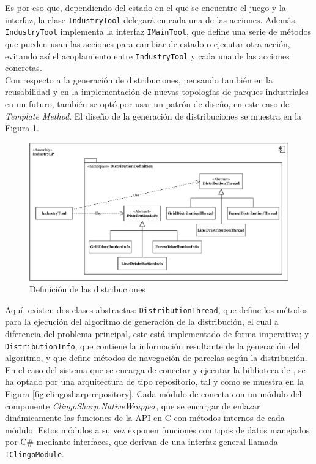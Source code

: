 Es por eso que, dependiendo del estado en el que se encuentre el juego y la interfaz, la clase \texttt{IndustryTool} delegará en cada una de las acciones. Además, \texttt{IndustryTool} implementa la interfaz \texttt{IMainTool}, que define una serie de métodos que pueden usan las acciones para cambiar de estado o ejecutar otra acción, evitando así el acoplamiento entre \texttt{IndustryTool} y cada una de las acciones concretas. \\

Con respecto a la generación de distribuciones, pensando también en la reusabilidad y en la implementación de nuevas topologías de parques industriales en un futuro, también se optó por usar un patrón de diseño, en este caso de \textit{Template Method}. El diseño de la generación de distribuciones se muestra en la Figura \ref{fig:distributions}.

\begin{figure}[!h]
	\centering
	\includegraphics[width=\textwidth]{images/distribuciones}
	\caption{Definición de las distribuciones}
	\label{fig:distributions}
\end{figure}

Aquí, existen dos clases abstractas: \texttt{DistributionThread}, que define los métodos para la ejecución del algoritmo de generación de la distribución, el cual a diferencia del problema principal, este está implementado de forma imperativa; y \texttt{DistributionInfo}, que contiene la información resultante de la generación del algoritmo, y que define métodos de navegación de parcelas según la distribución. \\

En el caso del sistema que se encarga de conectar y ejecutar la biblioteca de \clingo, se ha optado por una arquitectura de tipo repositorio, tal y como se muestra en la Figura \ref{fig:clingosharp-repository}. Cada módulo de \clingo conecta con un módulo del componente \textit{ClingoSharp.NativeWrapper}, que se encargar de enlazar dinámicamente las funciones de la API en C con métodos internos de cada módulo. Estos módulos a su vez exponen funciones con tipos de datos manejados por C\# mediante interfaces, que derivan de una interfaz general llamada \texttt{IClingoModule}. \\

